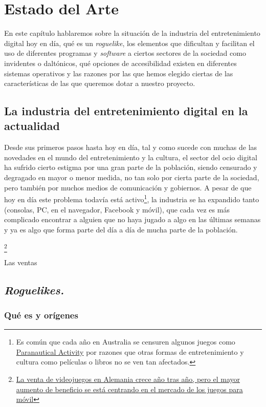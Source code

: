 \chapter{Estado del Arte}

En este capítulo hablaremos sobre la situación de la industria del entretenimiento digital hoy en día, qué es un \textit{roguelike}, los elementos que dificultan y facilitan el uso de diferentes programas y \textit{software} a ciertos sectores de la sociedad como invidentes o daltónicos, qué opciones de accesibilidad existen en diferentes sistemas operativos y las razones por las que hemos elegido ciertas de las características de las que queremos dotar a nuestro proyecto.

\section{La industria del entretenimiento digital en la actualidad}

Desde sus primeros pasos hasta hoy en día, tal y como sucede con muchas de las novedades en el mundo del entretenimiento y la cultura, el sector del ocio digital ha sufrido cierto estigma por una gran parte de la población, siendo censurado y degragado en mayor o menor medida, no tan solo por cierta parte de la sociedad, pero también por muchos medios de comunicación y gobiernos. A pesar de que hoy en día este problema todavía está activo\footnote{Es común que cada año en Australia se censuren algunos juegos como \href{http://goo.gl/hFrQah}{Paranautical Activity} por razones que otras formas de entretenimiento y cultura como películas o libros no se ven tan afectados.}, la industria se ha expandido tanto (consolas, PC, en el navegador, Facebook y móvil), que cada vez es más complicado encontrar a alguien que no haya jugado a algo en las últimas semanas y ya es algo que forma parte del día a día de mucha parte de la población.

\footnote{\href{http://www.statista.com/graphic/1/317604/video-games-industry-revenue-platform-germany.jpg}{La venta de videojuegos en Alemania crece año tras año, pero el mayor aumento de beneficio se está centrando en el mercado de los juegos para móvil}} 

Las ventas 

\section{\textit{Roguelikes.}}

\subsection{Qué es y orígenes}

